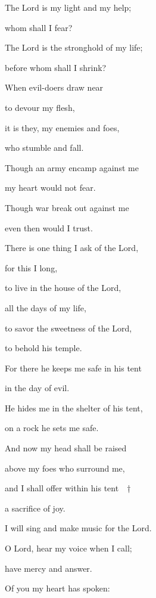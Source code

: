 \noindent The Lord is my light and my help;~\GreStar{}~\nopagebreak

whom shall I fear?

\noindent The Lord is the stronghold of my life;~\GreStar{}~\nopagebreak

before whom shall I shrink?

\noindent When evil-doers draw near~\GreStar{}~\nopagebreak

to devour my flesh,

\noindent it is they, my enemies and foes,~\GreStar{}~\nopagebreak

who stumble and fall.

\noindent Though an army encamp against me~\GreStar{}~\nopagebreak

my heart would not fear.

\noindent Though war break out against me~\GreStar{}~\nopagebreak

even then would I trust.

\noindent There is one thing I ask of the Lord,~\GreStar{}~\nopagebreak

for this I long,

\noindent to live in the house of the Lord,~\GreStar{}~\nopagebreak

all the days of my life,

\noindent to savor the sweetness of the Lord,~\GreStar{}~\nopagebreak

to behold his temple.

\noindent For there he keeps me safe in his tent~\GreStar{}~\nopagebreak

in the day of evil.

\noindent He hides me in the shelter of his tent,~\GreStar{}~\nopagebreak

on a rock he sets me safe.

\noindent And now my head shall be raised~\GreStar{}~\nopagebreak

above my foes who surround me,

\noindent and I shall offer within his tent~~†~\nopagebreak

a sacrifice of joy.~\GreStar{}~\nopagebreak

I will sing and make music for the Lord.

\noindent O Lord, hear my voice when I call;~\GreStar{}~\nopagebreak

have mercy and answer.

\noindent Of you my heart has spoken:~\GreStar{}~\nopagebreak

